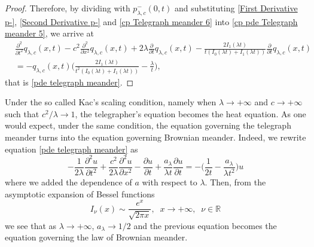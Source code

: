\documentclass{article}
\theoremstyle{definition}
\numberwithin{equation}{section}
\begin{document}
\begin{proof}
Therefore, by dividing with $p^{-}_{\lambda,c}(0,t)$ and substituting \eqref{First Derivative p-}, \eqref{Second Derivative p-} and \eqref{cp Telegraph meander 6} into \eqref{cp pde Telegraph meander 5}, we arrive at
\begin{align*}\label{pde Telegraph meander 2}
&\frac{\partial^2}{\partial t^2}q_{\lambda,c}(x,t) - c^2\frac{\partial^2}{\partial x^2}q_{\lambda,c}(x,t) +2\lambda\frac{\partial}{\partial t}q_{\lambda,c}(x,t)-\frac{2I_1(\lambda t)}{t(I_0(\lambda t)+I_1(\lambda t))} \frac{\partial}{\partial t}q_{\lambda,c}(x,t) \nonumber\\
&=-q_{\lambda,c}(x,t)\Big(\frac{2I_1(\lambda t)}{t^2(I_0(\lambda t)+I_1(\lambda t))}-\frac{\lambda}{t}\Big),
\end{align*}
that is \eqref{pde telegraph meander}.
\end{proof}
Under the so called Kac's scaling condition, namely when $\lambda \to +\infty$ and $c\to +\infty$ such that $c^2/\lambda \to 1$, the telegrapher's equation becomes the heat equation. As one would expect, under the same condition, the equation governing the telegraph meander turns into the equation governing Brownian meander. Indeed, we rewrite equation \eqref{pde telegraph meander} as
\begin{equation*}\label{pde telegraph meander 3}
-\frac{1}{2\lambda}\frac{\partial^2u}{\partial t^2}+\frac{c^2}{2\lambda}\frac{\partial^2 u}{\partial x^2}-\frac{\partial u}{\partial  t}+\frac{a_{\lambda}}{\lambda t}\frac{\partial u}{\partial t}=-\Big(\frac{1}{2t}-\frac{a_{\lambda}}{ \lambda t^2}\Big)u
\end{equation*}
where we added the dependence of $a$ with respect to $\lambda$. Then, from the asymptotic expansion of Bessel functions
\begin{equation}\label{Asymptotic bessel}
I_{\nu}(x) \sim \frac{e^x}{\sqrt{2\pi x}}, \;\; x \to +\infty, \;\; \nu \in \mathbb{R}
\end{equation}
we see that as $\lambda \to +\infty$, $a_\lambda \to 1/2$ and the previous equation becomes the equation governing the law of Brownian meander.
\end{document}
